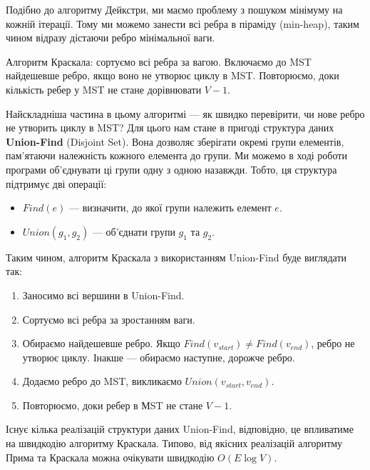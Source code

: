 \documentclass[12pt,a4paper]{report}
\begin{document}
Подібно до алгоритму Дейкстри, ми маємо проблему з пошуком мінімуму на кожній ітерації. Тому ми можемо занести всі ребра в піраміду (min-heap), таким чином відразу дістаючи ребро мінімальної ваги.



Алгоритм Краскала: сортуємо всі ребра за вагою. Включаємо до MST найдешевше ребро, якщо воно не утворює циклу в MST. Повторюємо, доки кількість ребер у MST не стане дорівнювати \(V - 1\).

Найскладніша частина в цьому алгоритмі --- як швидко перевірити, чи нове ребро не утворить циклу в MST? Для цього нам стане в пригоді структура даних \textbf{Union-Find} (Disjoint Set). Вона дозволяє зберігати окремі групи елементів, пам’ятаючи належність кожного елемента до групи. Ми можемо в ході роботи програми об’єднувати ці групи одну з одною назавжди. Тобто, ця структура підтримує дві операції:

\begin{itemize}
    \item \(Find(e)\) --- визначити, до якої групи належить елемент \(e\).
    \item \(Union(g_1, g_2)\) --- об’єднати групи \(g_1\) та \(g_2\).
\end{itemize}

Таким чином, алгоритм Краскала з використанням Union-Find буде виглядати так:

\begin{enumerate}
    \item Заносимо всі вершини в Union-Find.
    \item Сортуємо всі ребра за зростанням ваги.
    \item Обираємо найдешевше ребро. Якщо \(Find(v_{start}) \neq Find(v_{end})\), ребро не утворює циклу. Інакше --- обираємо наступне, дорожче ребро.
    \item Додаємо ребро до MST, викликаємо \(Union(v_{start}, v_{end})\).
    \item Повторюємо, доки ребер в МST не стане \(V - 1\).
\end{enumerate}



Існує кілька реалізацій структури даних Union-Find, відповідно, це впливатиме на швидкодію алгоритму Краскала. Типово, від якісних реалізацій алгоритму Прима та Краскала можна очікувати швидкодію \(O(E \log V)\).
\end{document}
